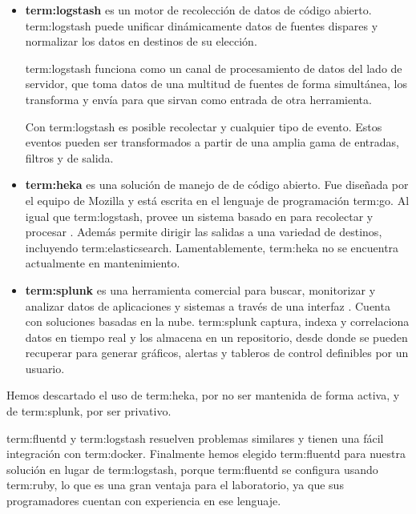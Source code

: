 \begin{itemize}

\item
\textbf{\gls{term:logstash}} es un motor de recolección de datos de código abierto.
\gls{term:logstash} puede unificar dinámicamente datos de fuentes dispares y
normalizar los datos en destinos de su elección.

\gls{term:logstash} funciona como un canal de procesamiento de datos del lado
de servidor, que toma datos de una multitud de fuentes de forma simultánea, los
transforma y envía para que sirvan como entrada de otra herramienta.

Con \gls{term:logstash} es posible recolectar  y cualquier tipo de evento.
Estos eventos pueden ser transformados a partir de una amplia gama de entradas,
filtros y  de salida.

\item
\textbf{\gls{term:heka}} es una solución de manejo de  de código abierto. Fue
diseñada por el equipo de Mozilla y está escrita en el lenguaje de programación
\gls{term:go}. Al igual que \gls{term:logstash}, provee un sistema basado en
 para recolectar y procesar . Además permite dirigir las
salidas a una variedad de destinos, incluyendo \gls{term:elasticsearch}.
Lamentablemente, \gls{term:heka} no se encuentra actualmente en mantenimiento.

\item
\textbf{\gls{term:splunk}} es una herramienta comercial para buscar, monitorizar y
analizar datos de aplicaciones y sistemas a través de una interfaz
. Cuenta con soluciones basadas en la nube. \gls{term:splunk}
captura, indexa y correlaciona datos en tiempo real y los almacena en un
repositorio, desde donde se pueden recuperar para generar gráficos, alertas y
tableros de control definibles por un usuario.

\end{itemize}

Hemos descartado el uso de \gls{term:heka}, por no ser mantenida de forma
activa, y de \gls{term:splunk}, por ser  privativo.

\gls{term:fluentd} y \gls{term:logstash} resuelven problemas similares y tienen
una fácil integración con \gls{term:docker}. Finalmente hemos elegido
\gls{term:fluentd} para nuestra solución en lugar de \gls{term:logstash},
porque \gls{term:fluentd} se configura usando \gls{term:ruby}, lo que es una
gran ventaja para el laboratorio, ya que sus programadores cuentan con
experiencia en ese lenguaje.

